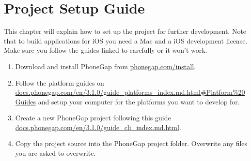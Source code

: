 \chapter{Project Setup Guide}

This chapter will explain how to set up the project for further development. Note that to build applications for iOS you need a Mac and a iOS development license\cite{iosCost}. Make sure you follow the guides linked to carefully or it won't work.

\begin{enumerate}
	\item{Download and install PhoneGap from \href{http://phonegap.com/install/}{phonegap.com/install}.}
	\item{Follow the platform guides on \newline \href{http://docs.phonegap.com/en/3.1.0/guide_platforms_index.md.html#Platform%20Guides}{docs.phonegap.com/en/3.1.0/guide\_platforms\_index.md.html\#Platform\%20Guides} and setup your computer for the platforms you want to develop for.}
	\item{Create a new PhoneGap project following this guide \newline \href{http://docs.phonegap.com/en/3.1.0/guide_cli_index.md.html}{docs.phonegap.com/en/3.1.0/guide\_cli\_index.md.html}.}
	\item{Copy the project source into the PhoneGap project folder. Overwrite any files you are asked to overwrite.}
\end{enumerate}